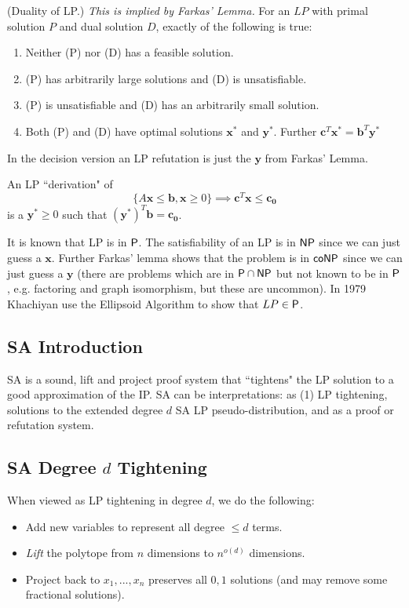 \begin{theorem}
(Duality of LP.) \emph{This is implied by Farkas' Lemma.} For an $LP$ with primal solution $P$ and dual solution $D$, exactly of the following is true:
\begin{enumerate}
\item Neither (P) nor (D) has a feasible solution.
\item (P) has arbitrarily large solutions and (D) is unsatisfiable.
\item (P) is unsatisfiable and (D) has an arbitrarily small solution.
\item Both (P) and (D) have optimal solutions $\mathbf{x}^*$ and $\mathbf{y}^*$. Further $\mathbf{c}^T\mathbf{x}^* = \mathbf{b}^T\mathbf{y}^*$
\end{enumerate}
\end{theorem}

In the decision version an LP refutation is just the $\mathbf{y}$ from Farkas' Lemma.

An LP ``derivation" of \[\{A\mathbf{x} \leq \mathbf{b}, \mathbf{x} \geq 0\} \implies \mathbf{c}^T\mathbf{x} \leq \mathbf{c_0}\]
is a $\mathbf{y}^* \geq 0$ such that $(\mathbf{y}^*)^T\mathbf{b} = \mathbf{c_0}$. 

It is known that LP is in $\mathsf{P}$. The satisfiability of an LP is in $\mathsf{NP}$ since we can just guess a $\mathbf{x}$. Further Farkas' lemma shows that the problem is in $\mathsf{coNP}$ since we can just guess a $\mathbf{y}$ (there are problems which are in $\mathsf{P} \cap \mathsf{NP}$ but not known to be in $\mathsf{P}$, e.g. factoring and graph isomorphism, but these are uncommon). In 1979 Khachiyan use the Ellipsoid Algorithm to show that $LP \in \mathsf{P}$.    

\subsection{SA Introduction}
SA is a sound, lift and project proof system that ``tightens" the LP solution to a good approximation of the IP. SA can be interpretations: as (1) LP tightening, solutions to the extended degree $d$ SA LP pseudo-distribution, and as a proof or refutation system.  

\subsection{SA Degree $d$ Tightening}
When viewed as LP tightening in degree $d$, we do the following:
\begin{itemize}
\item Add new variables to represent all degree $\leq d$ terms.
\item \emph{Lift} the polytope from $n$ dimensions to $n^{o(d)}$ dimensions.
\item Project back to $x_1, ..., x_n$ preserves all $0,1$ solutions (and may remove some fractional solutions).
\end{itemize}

